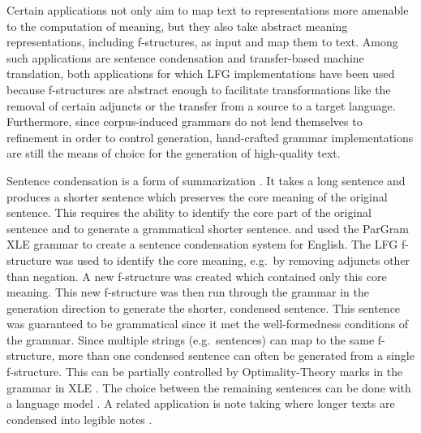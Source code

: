 \documentclass[output=paper,hidelinks]{langscibook}
\begin{document}
Certain applications  not only aim to map text to representations more amenable to the computation of meaning, but they also take abstract meaning representations, including f-structures, as input and map them to text. Among such applications are sentence condensation and transfer-based machine translation, both applications for which LFG implementations have been used because f-structures are abstract enough to facilitate transformations like the removal of certain adjuncts or the transfer from a source to a target language. Furthermore, since corpus-induced grammars do not lend themselves to refinement in order to control generation, hand-crafted grammar implementations are still the means of choice for the generation of high-quality  text.

Sentence condensation is a form of summarization \citep{knightmarcu2000,jing2000}. It takes a long sentence and produces a shorter sentence which preserves the core meaning of the original sentence. This requires the ability to identify the core part of the original sentence and to generate a grammatical shorter sentence. \cite{riezleretal03} and \cite{crouchetal04} used the ParGram XLE grammar to create a sentence condensation system for English. The LFG f-structure was used to identify the core meaning, e.g.\ by removing adjuncts other than negation. A new f-structure was created which contained only this core meaning. This new f-structure was then run through the grammar in the generation direction to generate the shorter, condensed sentence. This sentence was guaranteed to be grammatical since it met the well-formedness conditions of the grammar. Since multiple strings (e.g.\ sentences) can map to the same f-structure, more than one condensed sentence can often be generated from a single f-structure. This can be partially controlled by Optimality-Theory marks in the grammar in XLE \citep{franketal98}. The choice between the remaining sentences can be done with a language model \citep{riezleretal03}. A related application is note taking where longer texts are condensed into legible notes \citep{kaplanetal2005notetaking}.
\end{document}
